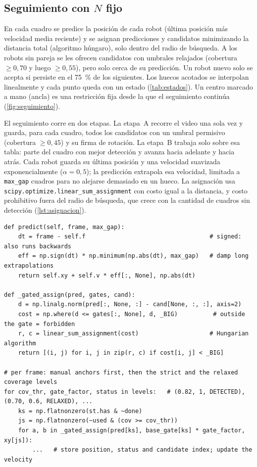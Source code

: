 \subsection{Seguimiento con $N$ fijo}\label{sec:seguimiento}

En cada cuadro se predice la posición de cada robot (última posición más velocidad media reciente) y
se asignan predicciones y candidatos minimizando la distancia total (algoritmo húngaro), solo dentro
del radio de búsqueda. A los robots sin pareja se les ofrecen candidatos con umbrales relajados
(cobertura $\geq 0{,}70$ y luego $\geq 0{,}55$), pero solo cerca de su predicción. Un robot nuevo solo
se acepta si persiste en el \SI{75}{\percent} de los  siguientes. Los huecos acotados se
interpolan linealmente y cada punto queda con un estado (\cref{tab:estados}). Un centro marcado a mano
(ancla) es una restricción fija desde la que el seguimiento continúa (\cref{fig:seguimiento}).

El seguimiento corre en dos etapas. La etapa~A recorre el video una sola vez y guarda, para cada
cuadro, todos los candidatos con un umbral permisivo (cobertura $\geq 0{,}45$) y su firma de
rotación. La etapa~B trabaja solo sobre esa tabla: parte del cuadro con mejor detección y avanza
hacia adelante y hacia atrás. Cada robot guarda su última posición y una velocidad suavizada
exponencialmente ($\alpha = 0{,}5$); la predicción extrapola esa velocidad, limitada a
\texttt{max\_gap} cuadros para no alejarse demasiado en un hueco. La asignación usa
\texttt{scipy.optimize.linear\_sum\_assignment} con costo igual a la distancia, y costo prohibitivo
fuera del radio de búsqueda, que crece con la cantidad de cuadros sin detección
(\cref{lst:asignacion}).

\begin{lstlisting}[caption={Predicción y asignación con compuerta (\texttt{core/tracking.py}, resumido).}, label=lst:asignacion]
def predict(self, frame, max_gap):
    dt = frame - self.f                                   # signed: also runs backwards
    eff = np.sign(dt) * np.minimum(np.abs(dt), max_gap)   # damp long extrapolations
    return self.xy + self.v * eff[:, None], np.abs(dt)

def _gated_assign(pred, gates, cand):
    d = np.linalg.norm(pred[:, None, :] - cand[None, :, :], axis=2)
    cost = np.where(d <= gates[:, None], d, _BIG)          # outside the gate = forbidden
    r, c = linear_sum_assignment(cost)                    # Hungarian algorithm
    return [(i, j) for i, j in zip(r, c) if cost[i, j] < _BIG]

# per frame: manual anchors first, then the strict and the relaxed coverage levels
for cov_thr, gate_factor, status in levels:   # (0.82, 1, DETECTED), (0.70, 0.6, RELAXED), ...
    ks = np.flatnonzero(st.has & ~done)
    js = np.flatnonzero(~used & (cov >= cov_thr))
    for a, b in _gated_assign(pred[ks], base_gate[ks] * gate_factor, xy[js]):
        ...   # store position, status and candidate index; update the velocity
\end{lstlisting}

